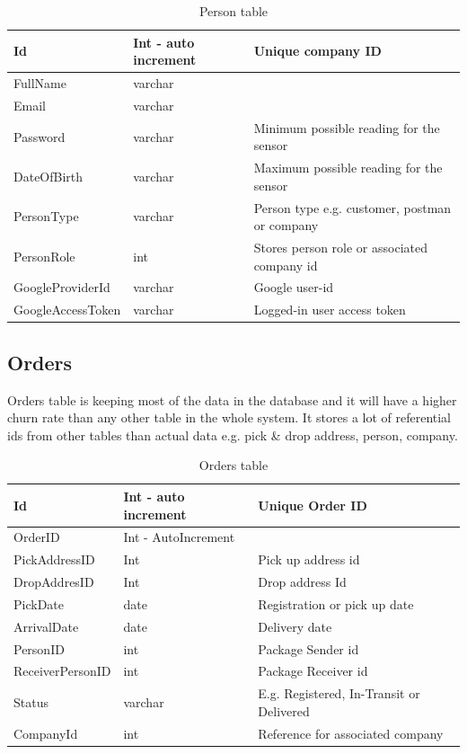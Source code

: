 \begin{table}[!ht]
    \begin{center}
    \begin{tabular}{ |l|l|l| } 
    \hline
    Id & Int - auto increment & Unique company ID \\
    \hline
    FullName & varchar & \\
    \hline
    Email  & varchar & \\
     \hline
    Password & varchar & Minimum possible reading for the sensor \\
     \hline
    DateOfBirth & varchar & Maximum possible reading for the sensor \\
     \hline
    PersonType & varchar & Person type e.g. customer, postman or company \\
    \hline
    PersonRole & int & Stores person role or associated company id \\
    \hline
    GoogleProviderId & varchar & Google user-id \\
    \hline
    GoogleAccessToken & varchar & Logged-in user access token\\
    \hline
    \end{tabular}
    \end{center}
    \caption{Person table}
\end{table}



\subsection{Orders}
Orders table is keeping most of the data in the database and it will have a higher churn rate than any other table in the whole system. It stores a lot of referential ids from other tables than actual data e.g. pick \& drop address, person, company. 

\begin{table}[!ht]
\begin{center}
\begin{tabular}{ |l|l|l| } 
 \hline
Id & Int - auto increment & Unique Order ID \\
 \hline

OrderID & Int - AutoIncrement  & \\
\hline
PickAddressID & Int & Pick up address id\\
\hline
DropAddresID  & Int  & Drop address Id\\
\hline
PickDate  & date & Registration or pick up date\\
\hline
ArrivalDate & date & Delivery date\\
\hline
PersonID & int & Package Sender id\\
\hline
ReceiverPersonID & int & Package Receiver id\\
\hline
Status & varchar & E.g. Registered, In-Transit or Delivered\\
\hline
CompanyId & int & Reference for associated company\\

 \hline
\end{tabular}
\end{center}
    \caption{Orders table}
\end{table}

